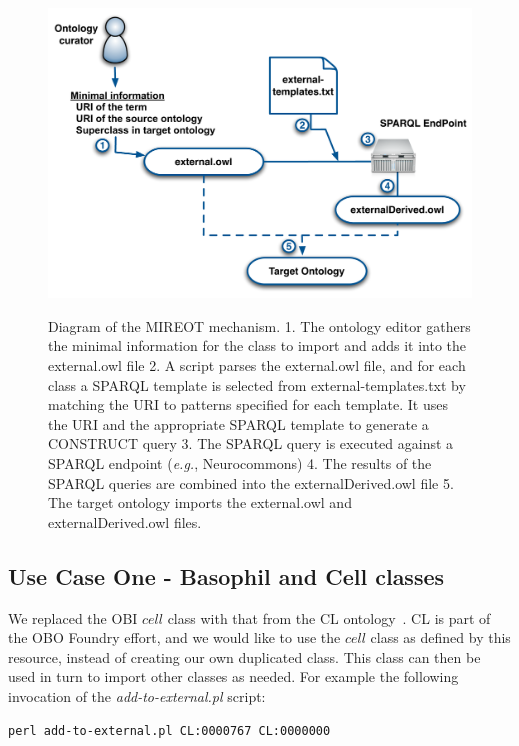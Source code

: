 \documentclass[jou]{ao2e}%
\begin{document}
\begin{figure}[t]
\centering
{
\includegraphics[width=.9\linewidth]{./figs/mechanism2.pdf}
}
\caption{Diagram of the MIREOT mechanism.
1. The ontology editor gathers the minimal information for the class to import and adds it into the external.owl file
2. A script parses the external.owl file, and for each class a SPARQL template is selected from external-templates.txt by matching the URI to patterns specified for each template. It uses the URI and the appropriate SPARQL template to generate a CONSTRUCT query
3. The SPARQL query is executed against a SPARQL endpoint (\emph{e.g.}, Neurocommons)
4. The results of the SPARQL queries are combined into the externalDerived.owl file
5. The target ontology imports the external.owl and externalDerived.owl files.
}
\label{fig:mechanism2}
\end{figure}




\subsection*{Use Case One - Basophil and Cell classes}

We replaced the \ac{OBI} $cell$ class with that from the \ac{CL} ontology~\citep{CL}. 
\ac{CL} is part of the \ac{OBO} Foundry effort, and we would like to use the $cell$ class as defined by this resource, instead of creating our own duplicated class.
This class can then be used in turn to import other classes as needed.
For example the following invocation of the \emph{add-to-external.pl} script:

\begin{footnotesize}
\begin{verbatim}
perl add-to-external.pl CL:0000767 CL:0000000 
\end{verbatim}
\end{footnotesize}
\end{document}

